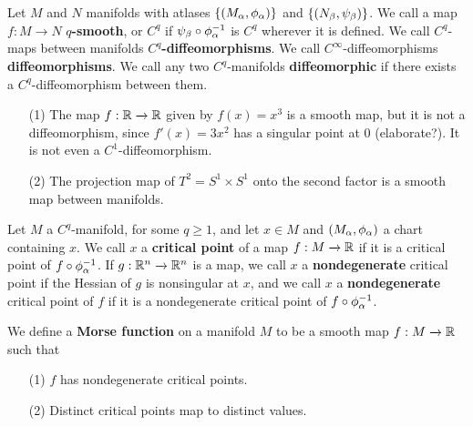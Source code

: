 \begin{definition}
    Let $M$ and $N$ manifolds with atlases  $\{(M_\alpha,\phi_\alpha)\}$ and $\{(N_\beta,
    \psi_\beta)\}$. We call a map $f:M \xrightarrow{} N$ \textbf{$q$-smooth}, or
    $C^q$ if  $\psi_\beta \circ \phi_\alpha^{-1}$ is $C^q$ wherever it is defined. We
    call  $C^q$-maps between manifolds  \textbf{$C^q$-diffeomorphisms}. We call
    $C^\infty$-diffeomorphisms  \textbf{diffeomorphisms}. We call any two
    $C^q$-manifolds  \textbf{diffeomorphic} if there exists a
    $C^q$-diffeomorphism between them.
\end{definition}

\begin{example}\label{example_1.7}
    \begin{enumerate}
        \item[(1)] The map $f:\mathbb{R} \xrightarrow{} \mathbb{R}$ given by $f(x)=x^3$ is a
            smooth map, but it is not a diffeomorphism, since $f'(x)=3x^2$ has a
            singular point at $0$ (elaborate?). It is not even a
            $C^1$-diffeomorphism.

        \item[(2)] The projection map of $T^2=S^1 \times S^1$ onto the second
            factor is a smooth map between manifolds.
    \end{enumerate}
\end{example}

\begin{definition}
    Let $M$ a  $C^q$-manifold, for some  $q \geq 1$, and let  $x \in M$ and
    $(M_\alpha,\phi_\alpha)$ a chart containing $x$. We call  $x$ a  \textbf{critical
    point} of a map $f:M \xrightarrow{} \mathbb{R}$ if it is a critical point of  $f \circ
    \phi_\alpha^{-1}$. If $g:\mathbb{R}^n \xrightarrow{} \mathbb{R}^n$ is a map, we call $x$ a
     \textbf{nondegenerate} critical point if the Hessian of $g$ is nonsingular
     at  $x$, and we call  $x$ a  \textbf{nondegenerate} critical point of $f$
     if it is a nondegenerate critical point of $f \circ \phi_\alpha^{-1}$.
\end{definition}

\begin{definition}
    We define a \textbf{Morse function} on a manifold $M$ to be a smooth map
    $f:M \xrightarrow{} \mathbb{R}$ such that
    \begin{enumerate}
        \item[(1)] $f$ has nondegenerate critical points.

        \item[(2)] Distinct critical points map to distinct values.
    \end{enumerate}
\end{definition}

